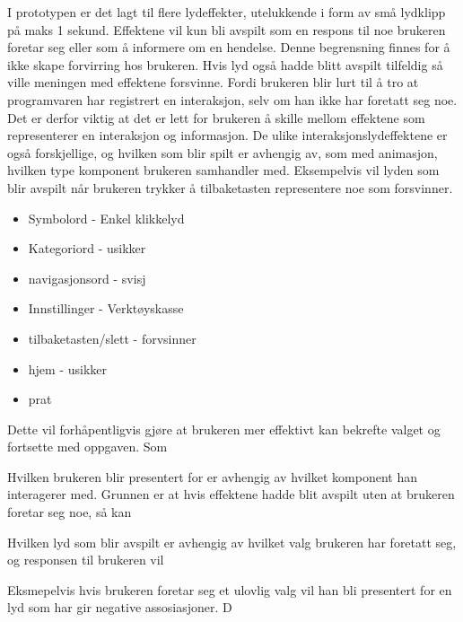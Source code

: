 { 
I prototypen er det lagt til flere lydeffekter, utelukkende i form av små lydklipp på maks 1 sekund. Effektene vil kun bli avspilt som en respons til noe brukeren foretar seg eller som å informere om en hendelse. Denne begrensning finnes for å ikke skape forvirring hos brukeren. Hvis lyd også hadde blitt avspilt tilfeldig så ville meningen med effektene forsvinne. Fordi brukeren blir lurt til å tro at programvaren har registrert en interaksjon, selv om han ikke har foretatt seg noe. Det er derfor viktig at det er lett for brukeren å skille mellom effektene som representerer en interaksjon og informasjon. De ulike interaksjonslydeffektene er også forskjellige, og hvilken som blir spilt er avhengig av,  som med animasjon,  hvilken type komponent brukeren samhandler med. Eksempelvis vil lyden som blir avspilt når brukeren trykker å tilbaketasten representere noe som forsvinner.  
 
 
 
 
\begin{itemize} 
\item Symbolord - Enkel klikkelyd 
\item Kategoriord - usikker 
\item navigasjonsord - svisj 
\item Innstillinger - Verktøyskasse 
\item tilbaketasten/slett - forvsinner 
\item hjem - usikker 
\item prat 
\end{itemize} 
 
 
 
 
 
 
 
 
 
 
Dette vil forhåpentligvis gjøre at brukeren mer effektivt kan bekrefte valget og fortsette med oppgaven. Som  
 
 
 
 
 
 
Hvilken brukeren blir presentert for er avhengig av hvilket komponent han interagerer med.  Grunnen er at hvis effektene hadde blit avspilt uten at brukeren foretar seg noe, så kan 
 
 
 
 
Hvilken lyd som blir avspilt er avhengig av hvilket valg brukeren har foretatt seg, og responsen til brukeren vil  
 
 
Eksmepelvis hvis brukeren foretar seg et ulovlig valg vil han bli presentert for en lyd som har gir negative assosiasjoner.  D 
 
}
